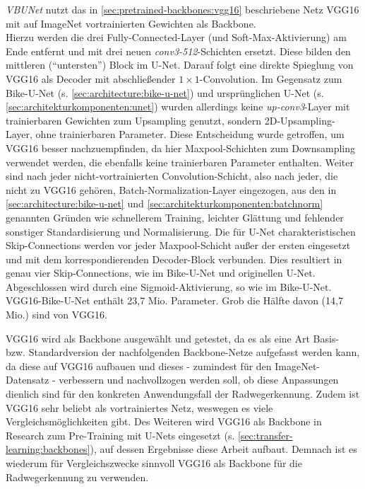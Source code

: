 \textit{\ac{VBUNet}} nutzt das in \autoref{sec:pretrained-backbones:vgg16} beschriebene Netz VGG16 
mit auf ImageNet vortrainierten Gewichten als Backbone. \\
Hierzu werden die drei Fully-Connected-Layer 
(und Soft-Max-Aktivierung) am Ende entfernt und mit drei neuen \textit{conv3-512}-Schichten ersetzt. 
Diese bilden den mittleren (\enquote{untersten}) Block im U-Net. Darauf folgt eine direkte Spieglung 
von VGG16 als Decoder mit abschließender $1\times 1$-Convolution. Im Gegensatz zum Bike-U-Net (s. \autoref{sec:architecture:bike-u-net}) 
und ursprünglichen U-Net (s. \autoref{sec:architekturkomponenten:unet}) wurden allerdings keine 
\textit{up-conv3}-Layer mit trainierbaren Gewichten zum Upsampling genutzt, sondern 2D-Upsampling-Layer, 
ohne trainierbaren Parameter. Diese Entscheidung wurde getroffen, um VGG16 besser nachzuempfinden, 
da hier Maxpool-Schichten zum Downsampling verwendet werden, die ebenfalls keine trainierbaren Parameter enthalten.
Weiter sind nach jeder nicht-vortrainierten Convolution-Schicht, also nach jeder, die nicht zu VGG16 gehören, 
Batch-Normalization-Layer eingezogen, aus den in \autoref{sec:architecture:bike-u-net} und \autoref{sec:architekturkomponenten:batchnorm}
genannten Gründen wie schnellerem Training, leichter Glättung und fehlender sonstiger Standardisierung und Normalisierung.
Die für U-Net charakteristischen Skip-Connections werden vor jeder Maxpool-Schicht außer der ersten eingesetzt 
und mit dem korrespondierenden Decoder-Block verbunden. Dies resultiert in genau vier Skip-Connections, 
wie im Bike-U-Net und originellen U-Net. Abgeschlossen wird durch eine Sigmoid-Aktivierung, so wie im Bike-U-Net. \\
VGG16-Bike-U-Net enthält 23,7 Mio. Parameter. Grob die Hälfte davon (14,7 Mio.) sind von VGG16. 

VGG16 wird als Backbone ausgewählt und getestet, da es als eine Art Basis- bzw. Standardversion der nachfolgenden 
Backbone-Netze aufgefasst werden kann, da diese auf VGG16 aufbauen und dieses - zumindest 
für den ImageNet-Datensatz - verbessern und nachvollzogen werden soll, ob diese Anpassungen dienlich sind 
für den konkreten Anwendungsfall der Radwegerkennung. Zudem ist VGG16 sehr beliebt als vortrainiertes 
Netz, weswegen es viele Vergleichsmöglichkeiten gibt. 
Des Weiteren wird VGG16 als Backbone in Research zum Pre-Training mit U-Nets eingesetzt (s. \autoref{sec:transfer-learning:backbones}), 
auf dessen Ergebnisse diese Arbeit aufbaut. 
Demnach ist es wiederum für Vergleichszwecke sinnvoll VGG16 als Backbone für die Radwegerkennung zu verwenden.   

